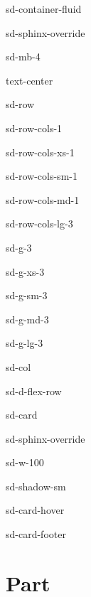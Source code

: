 \documentclass[letterpaper,10pt,english]{jupyterBook}
\begin{document}
\begin{sphinxuseclass}{sd-container-fluid}
\begin{sphinxuseclass}{sd-sphinx-override}
\begin{sphinxuseclass}{sd-mb-4}
\begin{sphinxuseclass}{text-center}
\begin{sphinxuseclass}{sd-row}
\begin{sphinxuseclass}{sd-row-cols-1}
\begin{sphinxuseclass}{sd-row-cols-xs-1}
\begin{sphinxuseclass}{sd-row-cols-sm-1}
\begin{sphinxuseclass}{sd-row-cols-md-1}
\begin{sphinxuseclass}{sd-row-cols-lg-3}
\begin{sphinxuseclass}{sd-g-3}
\begin{sphinxuseclass}{sd-g-xs-3}
\begin{sphinxuseclass}{sd-g-sm-3}
\begin{sphinxuseclass}{sd-g-md-3}
\begin{sphinxuseclass}{sd-g-lg-3}
\begin{sphinxuseclass}{sd-col}
\begin{sphinxuseclass}{sd-d-flex-row}
\begin{sphinxuseclass}{sd-card}
\begin{sphinxuseclass}{sd-sphinx-override}
\begin{sphinxuseclass}{sd-w-100}
\begin{sphinxuseclass}{sd-shadow-sm}
\begin{sphinxuseclass}{sd-card-hover}
\begin{sphinxuseclass}{sd-card-footer}
\end{sphinxuseclass}
\end{sphinxuseclass}
\end{sphinxuseclass}
\end{sphinxuseclass}
\end{sphinxuseclass}
\end{sphinxuseclass}
\end{sphinxuseclass}
\end{sphinxuseclass}
\end{sphinxuseclass}
\end{sphinxuseclass}
\end{sphinxuseclass}
\end{sphinxuseclass}
\end{sphinxuseclass}
\end{sphinxuseclass}
\end{sphinxuseclass}
\end{sphinxuseclass}
\end{sphinxuseclass}
\end{sphinxuseclass}
\end{sphinxuseclass}
\end{sphinxuseclass}
\end{sphinxuseclass}
\end{sphinxuseclass}
\end{sphinxuseclass}
\sphinxstepscope


\part{Part}

\sphinxstepscope
\end{document}
